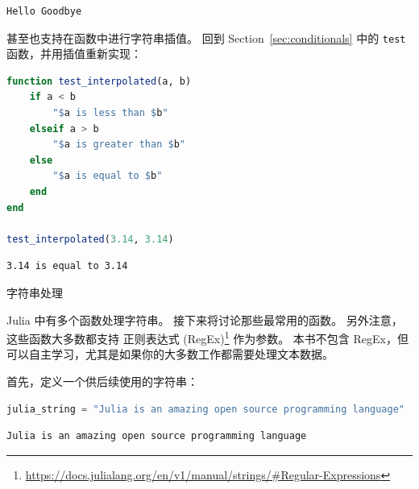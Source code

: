 \documentclass[
  notoc %
]{tufte-book}
\makeatletter
\DeclareRobustCommand{\href}[2]{#2\footnote{\url{#1}}}
\newcommand{\passthrough}[1]{#1}
\renewcommand\subsubsection{%
\@startsection{subsubsection}{3}{\z@ }{-3.25ex\@plus -1ex \@minus -.2ex}{1.5ex \@plus .2ex}{\normalfont \normalsize \bfseries }
}
\makeatother
\begin{document}
\begin{lstlisting}[language=Output]
Hello Goodbye
\end{lstlisting}

甚至也支持在函数中进行字符串插值。 回到 Section~\ref{sec:conditionals}
中的 \passthrough{\lstinline!test!} 函数，并用插值重新实现：

\begin{lstlisting}[language=Julia]
function test_interpolated(a, b)
    if a < b
        "$a is less than $b"
    elseif a > b
        "$a is greater than $b"
    else
        "$a is equal to $b"
    end
end

test_interpolated(3.14, 3.14)
\end{lstlisting}

\begin{lstlisting}[language=Output]
3.14 is equal to 3.14
\end{lstlisting}

\hypertarget{sec:string_manipulations}{%
\subsubsection{字符串处理}\label{sec:string_manipulations}}

Julia 中有多个函数处理字符串。 接下来将讨论那些最常用的函数。
另外注意，这些函数大多数都支持
\href{https://docs.julialang.org/en/v1/manual/strings/\#Regular-Expressions}{正则表达式
(RegEx)} 作为参数。 本书不包含
RegEx，但可以自主学习，尤其是如果你的大多数工作都需要处理文本数据。

首先，定义一个供后续使用的字符串：

\begin{lstlisting}[language=Julia]
julia_string = "Julia is an amazing open source programming language"
\end{lstlisting}

\begin{lstlisting}[language=Output]
Julia is an amazing open source programming language
\end{lstlisting}
\end{document}
